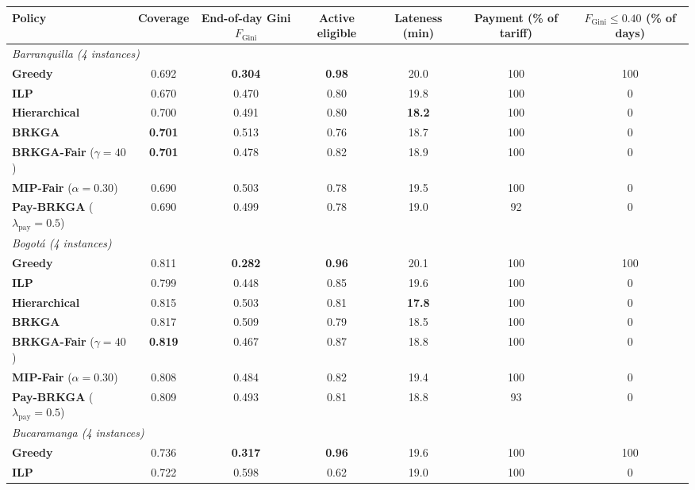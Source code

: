 \documentclass[a4paper,11pt,review,3p,authoryear]{elsarticle}
\newlength{\portraitwidth}\AtBeginDocument{\setlength{\portraitwidth}{\textwidth}} %
\newcommand{\FG}{F_{\text{Gini}}}
\begin{document}
\begin{table}
\centering
\scriptsize
\begin{adjustbox}{max width=\textheight, max totalheight=0.92\portraitwidth}
\begin{tabular}{l|c|c|c|c|c|c}
\hline
\textbf{Policy} & \textbf{Coverage} & \textbf{End-of-day Gini $\FG$} & \textbf{Active eligible} & \textbf{Lateness (min)} & \textbf{Payment (\% of tariff)} & \textbf{$\FG \le 0.40$ (\% of days)} \\
\hline
\multicolumn{7}{l}{\textit{Barranquilla (4 instances)}} \\
\textbf{Greedy} & 0.692 & \textbf{0.304} & \textbf{0.98} & 20.0 & 100 & 100 \\
\textbf{ILP} & 0.670 & 0.470 & 0.80 & 19.8 & 100 & 0 \\
\textbf{Hierarchical} & 0.700 & 0.491 & 0.80 & \textbf{18.2} & 100 & 0 \\
\textbf{BRKGA} & \textbf{0.701} & 0.513 & 0.76 & 18.7 & 100 & 0 \\
\textbf{BRKGA-Fair} ($\gamma = 40$) & \textbf{0.701} & 0.478 & 0.82 & 18.9 & 100 & 0 \\
\textbf{MIP-Fair} ($\alpha = 0.30$) & 0.690 & 0.503 & 0.78 & 19.5 & 100 & 0 \\
\textbf{Pay-BRKGA} ($\lambda_{\text{pay}} = 0.5$) & 0.690 & 0.499 & 0.78 & 19.0 & 92 & 0 \\
\hline
\multicolumn{7}{l}{\textit{Bogot\'a (4 instances)}} \\
\textbf{Greedy} & 0.811 & \textbf{0.282} & \textbf{0.96} & 20.1 & 100 & 100 \\
\textbf{ILP} & 0.799 & 0.448 & 0.85 & 19.6 & 100 & 0 \\
\textbf{Hierarchical} & 0.815 & 0.503 & 0.81 & \textbf{17.8} & 100 & 0 \\
\textbf{BRKGA} & 0.817 & 0.509 & 0.79 & 18.5 & 100 & 0 \\
\textbf{BRKGA-Fair} ($\gamma = 40$) & \textbf{0.819} & 0.467 & 0.87 & 18.8 & 100 & 0 \\
\textbf{MIP-Fair} ($\alpha = 0.30$) & 0.808 & 0.484 & 0.82 & 19.4 & 100 & 0 \\
\textbf{Pay-BRKGA} ($\lambda_{\text{pay}} = 0.5$) & 0.809 & 0.493 & 0.81 & 18.8 & 93 & 0 \\
\hline
\multicolumn{7}{l}{\textit{Bucaramanga (4 instances)}} \\
\textbf{Greedy} & 0.736 & \textbf{0.317} & \textbf{0.96} & 19.6 & 100 & 100 \\
\textbf{ILP} & 0.722 & 0.598 & 0.62 & 19.0 & 100 & 0 \\

\end{tabular}
\end{adjustbox}
\end{table}
\end{document}
